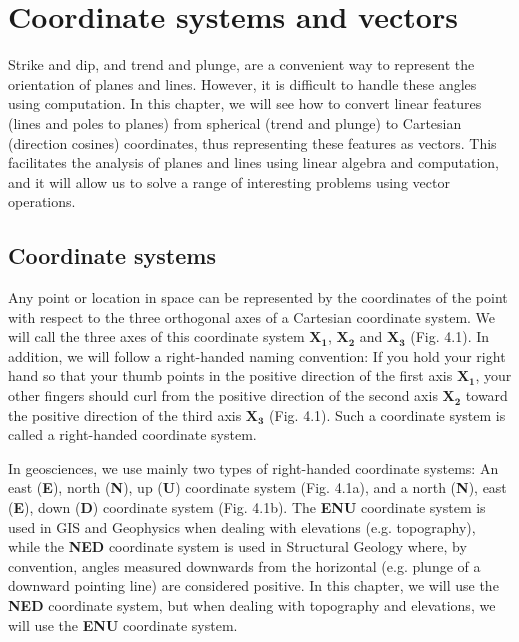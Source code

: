 \documentclass[a4paper , 12pt]{book}
\begin{document}
\chapter{Coordinate systems and vectors}

Strike and dip, and trend and plunge, are a convenient way to represent the orientation of planes and lines. However, it is difficult to handle these angles using computation. In this chapter, we will see how to convert linear features (lines and poles to planes) from spherical (trend and plunge) to Cartesian (direction cosines) coordinates, thus representing these features as vectors. This facilitates the analysis of planes and lines using linear algebra and computation, and it will allow us to solve a range of interesting problems using vector operations.

\section{Coordinate systems}

Any point or location in space can be represented by the coordinates of the point with respect to the three orthogonal axes of a Cartesian coordinate system. We will call the three axes of this coordinate system $\mathbf{X_1}$, $\mathbf{X_2}$ and $\mathbf{X_3}$ (Fig. 4.1). In addition, we will follow a right-handed naming convention: If you hold your right hand so that your thumb points in the positive direction of the first axis $\mathbf{X_1}$, your other fingers should curl from the positive direction of the second axis $\mathbf{X_2}$ toward the positive direction of the third axis $\mathbf{X_3}$ (Fig. 4.1). Such a coordinate system is called a right-handed coordinate system.

In geosciences, we use mainly two types of right-handed coordinate systems: An east (\textbf{E}), north (\textbf{N}), up (\textbf{U}) coordinate system (Fig. 4.1a), and a north (\textbf{N}), east (\textbf{E}), down (\textbf{D}) coordinate system (Fig. 4.1b). The \textbf{ENU} coordinate system is used in GIS and Geophysics when dealing with elevations (e.g. topography), while the \textbf{NED} coordinate system is used in Structural Geology where, by convention, angles measured downwards from the horizontal (e.g. plunge of a downward pointing line) are considered positive. In this chapter, we will use the \textbf{NED} coordinate system, but when dealing with topography and elevations, we will use the \textbf{ENU} coordinate system.
\end{document}
